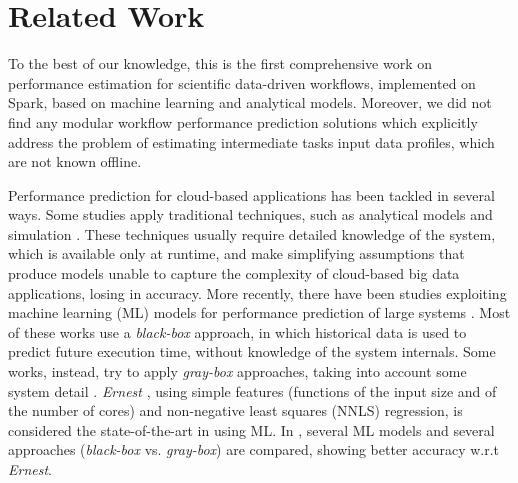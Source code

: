 \documentclass[a4paper, 10pt, conference]{ieeeconf}      %
\begin{document}
\section{Related Work}
\label{section:related_work}
To the best of our knowledge, this is the first comprehensive work on performance estimation for scientific data-driven workflows, implemented on Spark, based on machine learning and analytical models. 
Moreover, we did not find any modular workflow performance prediction solutions which explicitly address the problem of estimating intermediate tasks input data profiles, which are not known offline.

Performance prediction for cloud-based applications has been tackled in several ways. 
Some studies apply traditional techniques, such as analytical models \cite{nelson1988approximate, mak, ardagna1, liang2000performance} and simulation \cite{bertoli2009jmt}. These techniques usually require detailed knowledge of the system, which is available only at runtime, and make  simplifying assumptions that  produce models unable to capture the complexity of cloud-based big data applications, losing in accuracy. More recently, there have been studies exploiting machine learning (ML) models for performance prediction of large systems \cite{ernest, MUSTAFA20183767, pan2017hemingway, alipourfard2017cherrypick, ARDAGNA2019}.
Most of these works use a \textit{black-box} approach, in which historical data is used to predict future execution time, without knowledge of the system internals. Some works, instead, try to apply \textit{gray-box} approaches, taking into account some system detail \cite{ARDAGNA2019, shon2008scientific}. 
\textit{Ernest} \cite{ernest}, using simple features (functions of the input size and of the number of cores) and non-negative least squares (NNLS) regression, is considered the state-of-the-art in using ML. In \cite{ARDAGNA2019}, several ML models and several approaches (\textit{black-box} vs. \textit{gray-box}) are compared, showing better accuracy w.r.t \textit{Ernest}.
\end{document}
